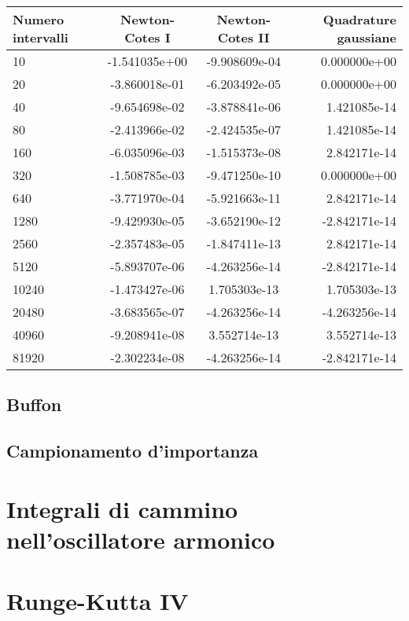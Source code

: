 \begin{tabular}{lccr}
 \toprule
  Numero intervalli & Newton-Cotes I & Newton-Cotes II & Quadrature gaussiane \\
  \midrule
 10 &	-1.541035e+00 &	-9.908609e-04	& 0.000000e+00 \\
20 &	 -3.860018e-01 & -6.203492e-05	& 0.000000e+00 \\
40 &	-9.654698e-02 &	-3.878841e-06 &	1.421085e-14 \\
80 &	-2.413966e-02 &	-2.424535e-07 &	1.421085e-14 \\ 
160 &	-6.035096e-03 &	-1.515373e-08 &	2.842171e-14 \\
320 &	-1.508785e-03 &	-9.471250e-10 &	0.000000e+00 \\ 
640 &	-3.771970e-04 &	-5.921663e-11 &	2.842171e-14 \\
1280 &	-9.429930e-05 &	-3.652190e-12 &	-2.842171e-14 \\
2560 &	-2.357483e-05 &	-1.847411e-13 &	2.842171e-14 \\ 
5120 &	-5.893707e-06 &	-4.263256e-14 &	-2.842171e-14 \\
10240 &	-1.473427e-06 &	1.705303e-13 &	1.705303e-13 \\ 
20480 &	-3.683565e-07 &	-4.263256e-14 &	-4.263256e-14 \\
40960 &	-9.208941e-08 &	3.552714e-13 &	3.552714e-13  \\
81920 &	-2.302234e-08 &	-4.263256e-14 &	-2.842171e-14 \\

 \bottomrule
\end{tabular}

\subsection{Buffon}


\subsection{Campionamento d'importanza} 

\section{Integrali di cammino nell'oscillatore armonico}

\section{Runge-Kutta IV}

